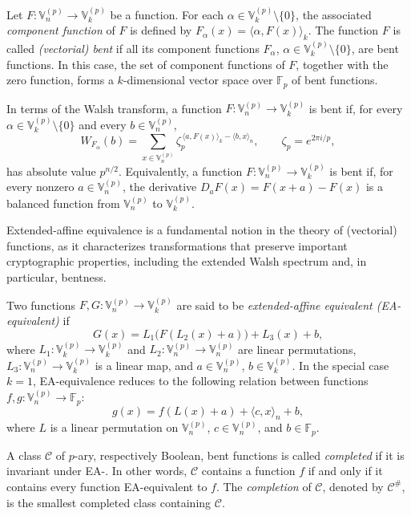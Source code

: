 \documentclass[12pt]{article}
\theoremstyle{plain}
\theoremstyle{definition}
\newcommand{\V}{\mathbb{V}}
\renewcommand{\to}{\rightarrow}
\begin{document}
	Let \(F : \V_n^{(p)} \to \V_k^{(p)}\) be a function.
	For each \(\alpha \in \V_k^{(p)} \setminus \{0\}\), the associated \emph{component
		function} of \(F\) is defined by $F_\alpha (x) = \langle \alpha , F(x) \rangle_k$.
	The function \(F\) is called \emph{(vectorial) bent} if all its
	component functions \(F_\alpha \), \(\alpha \in \V_k^{(p)} \setminus \{0\}\), are 
	bent functions.
	In this case, the set of component functions of \(F\), together with the zero
	function, forms a \(k\)-dimensional vector space over \(\mathbb{F}_p\)
	of bent functions.
	
	In terms of the Walsh transform, a function
	\(F : \V_n^{(p)} \to \V_k^{(p)}\) is bent if, for every
	\(\alpha \in \V_k^{(p)} \setminus \{0\}\) and every \(b \in \V_n^{(p)}\),
	\[
	W_{F_\alpha}(b)
	=
	\sum_{x \in \V_n^{(p)}}
	\zeta_p^{\,\langle a, F(x) \rangle_k - \langle b, x \rangle_n},
	\qquad
	\zeta_p = e^{2\pi i/p},
	\]
	has absolute value \(p^{n/2}\). Equivalently, a function \(F : \V_n^{(p)} \to \V_k^{(p)}\) is bent if,
	for every nonzero \(a \in \V_n^{(p)}\), the derivative $D_a F(x) = F(x + a) - F(x)$
	is a balanced function from \(\V_n^{(p)}\) to \(\V_k^{(p)}\).
	
	Extended-affine equivalence is a fundamental notion in the theory of
	(vectorial) functions, as it characterizes transformations that
	preserve important cryptographic properties, including the extended Walsh
	spectrum and, in particular, bentness.
	
	Two functions
	\(F, G : \V_n^{(p)} \to \V_k^{(p)}\) are said to be
	\emph{extended-affine equivalent (EA-equivalent) } if
	\[
	G(x) = L_1\!\bigl(F(L_2(x) + a)\bigr) + L_3(x) + b,
	\]
	where \(L_1 : \V_k^{(p)} \to \V_k^{(p)}\) and
	\(L_2 : \V_n^{(p)} \to \V_n^{(p)}\) are linear permutations,
	\(L_3 : \V_n^{(p)} \to \V_k^{(p)}\) is a linear map, and
	\(a \in \V_n^{(p)}\), \(b \in \V_k^{(p)}\).
	In the special case \(k = 1\), EA-equivalence reduces to the following relation
	between functions \(f, g : \V_n^{(p)} \to \mathbb{F}_p\):
	\[
	g(x) = f(L(x) + a) + \langle c, x \rangle_n + b,
	\]
	where \(L\) is a linear permutation on \(\V_n^{(p)}\),
	\(c \in \V_n^{(p)}\), and \(b\in \mathbb{F}_p\).
	
	A class \(\mathcal{C}\) of \(p\)-ary, respectively Boolean, bent functions is
	called \emph{completed} if it is invariant under EA-. In other words, \(\mathcal{C}\) contains a function \(f\) if and only if
	it contains every function EA-equivalent to \(f\).
	The \emph{completion} of \(\mathcal{C}\), denoted by \(\mathcal{C}^{\#}\), is
	the smallest completed class containing \(\mathcal{C}\).
	
\end{document}
